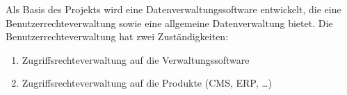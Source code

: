 Als Basis des Projekts wird eine Datenverwaltungssoftware entwickelt, die
eine Benutzerrechteverwaltung sowie eine allgemeine Datenverwaltung bietet.
Die Benutzerrechteverwaltung hat zwei Zuständigkeiten:
\begin{enumerate}
	\item Zugriffsrechteverwaltung auf die Verwaltungssoftware
	\item Zugriffsrechteverwaltung auf die Produkte (CMS, ERP, \ldots)
\end{enumerate}